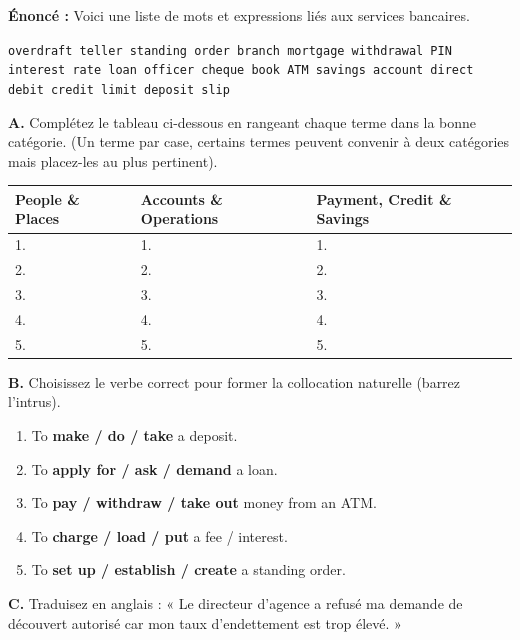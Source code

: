 \documentclass[11pt]{article}
\begin{document}
\begin{exoresolu}
    \textbf{Énoncé :} Voici une liste de mots et expressions liés aux services bancaires. 
    \begin{center}
        \texttt{overdraft \quad teller \quad standing order \quad branch \quad mortgage \quad withdrawal \quad PIN \quad interest rate \quad loan officer \quad cheque book \quad ATM \quad savings account \quad direct debit \quad credit limit \quad deposit slip}
    \end{center}
    \textbf{A.} Complétez le tableau ci-dessous en rangeant chaque terme dans la bonne catégorie. (Un terme par case, certains termes peuvent convenir à deux catégories mais placez-les au plus pertinent).
    \begin{center}
        \begin{tabularx}{\linewidth}{|X|X|X|}\hline 
        \rowcolor{popblueL} \textbf{People \& Places} & \textbf{Accounts \& Operations} & \textbf{Payment, Credit \& Savings} \\ \hline
        1. & 1. & 1. \\ \hline
        2. & 2. & 2. \\ \hline
        3. & 3. & 3. \\ \hline
        4. & 4. & 4. \\ \hline
        5. & 5. & 5. \\ \hline
    \end{tabularx}
    \end{center}
    \textbf{B.} Choisissez le verbe correct pour former la collocation naturelle (barrez l'intrus).
    \begin{enumerate}
        \item To \textbf{make / do / take} a deposit.
        \item To \textbf{apply for / ask / demand} a loan.
        \item To \textbf{pay / withdraw / take out} money from an ATM.
        \item To \textbf{charge / load / put} a fee / interest.
        \item To \textbf{set up / establish / create} a standing order.
    \end{enumerate}
    \textbf{C.} Traduisez en anglais : « Le directeur d'agence a refusé ma demande de découvert autorisé car mon taux d'endettement est trop élevé. »
    

\end{exoresolu}
\end{document}
